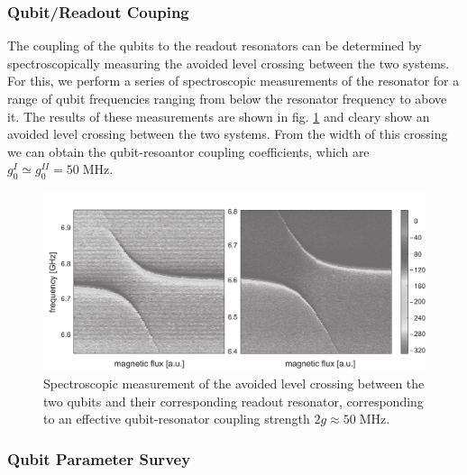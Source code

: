 \subsubsection{Qubit/Readout Couping}

The coupling of the qubits to the readout resonators can be determined by spectroscopically measuring the avoided level crossing between the two systems. For this, we perform a series of spectroscopic measurements of the resonator for a range of qubit frequencies ranging from below the resonator frequency to above it. The results of these measurements are shown in fig. \ref{fig:qubit_resonator_anticrossing} and cleary show an avoided level crossing between the two systems. From the width of this crossing we can obtain the qubit-resoantor coupling coefficients, which are $g_0^I \simeq g_0^{II} = 50 \; \mathrm{MHz}$.

\begin{figure}[htb!]
	\centering
	\includegraphics[width=1\textwidth]{"./data/ct5/cavity anticrossing/qubits_anticrossing_bw"}
	\caption[Spectroscopic measurement of the avoided level crossing between the two qubits and their corresponding readout resonator]{Spectroscopic measurement of the avoided level crossing between the two qubits and their corresponding readout resonator, corresponding to an effective qubit-resonator coupling strength $2g\approx 50\;\mathrm{MHz}$.}
	\label{fig:qubit_resonator_anticrossing}
\end{figure}


\subsubsection{Qubit Parameter Survey}

